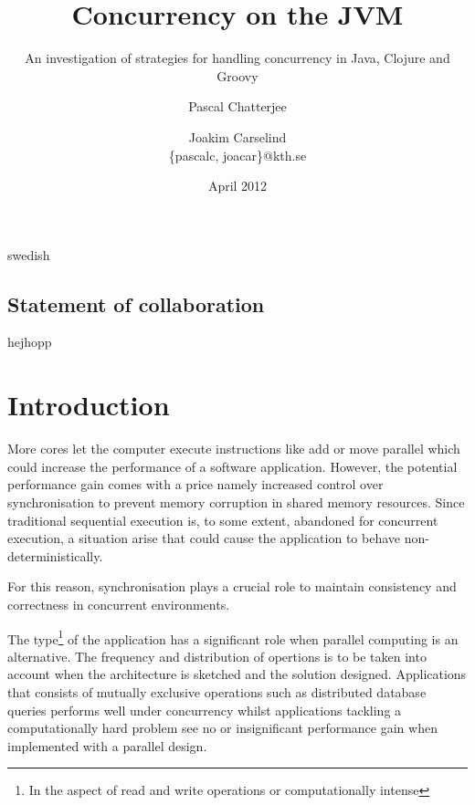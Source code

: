 \documentclass[a4paper,12pt]{kth-mag}
\title{Concurrency on the JVM}
\subtitle{An investigation of strategies for handling concurrency in Java, Clojure and Groovy}
\author{Pascal Chatterjee \and Joakim Carselind \\ \small{\{pascalc, joacar\}@kth.se}}
\date{April 2012}
\begin{document}
\frontmatter
\pagestyle{empty}
\removepagenumbers
\maketitle
{}

\begin{abstract}
    
\end{abstract}

\clearpage

\begin{foreignabstract}{swedish}
  
\end{foreignabstract}

\clearpage
\section{Statement of collaboration}
hejhopp

\clearpage

\tableofcontents*
\mainmatter
\pagestyle{newchap}
\makeatletter\@openrightfalse

\chapter{Introduction}
More cores let the computer execute instructions like add or move parallel which could increase the performance of a software application. However, the potential performance gain comes with a price namely increased control over synchronisation to prevent memory corruption in shared memory resources. Since traditional sequential execution is, to some extent, abandoned for concurrent execution, a situation arise that could cause the application to behave non-deterministically.

For this reason, synchronisation plays a crucial role to maintain consistency and correctness in concurrent environments.

The type\footnote{In the aspect of read and write operations or computationally intense} of the application has a significant role when parallel computing is an alternative. The frequency and distribution of opertions is to be taken into account when the architecture is sketched and the solution designed. Applications that consists of mutually exclusive operations such as distributed database queries performs well under concurrency whilst applications tackling a computationally hard problem see no or insignificant performance gain when implemented with a parallel design.
\end{document}
